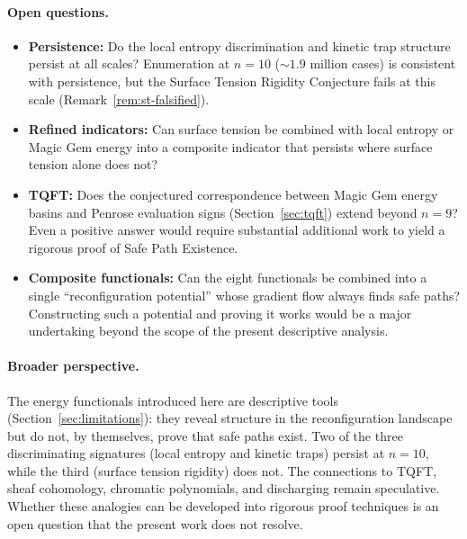 \paragraph{Open questions.}
\begin{itemize}
  \item \textbf{Persistence:} Do the local entropy discrimination and
    kinetic trap structure persist at all scales? Enumeration at
    $n = 10$ (${\sim}1.9$ million cases) is consistent with
    persistence, but the Surface Tension Rigidity Conjecture fails at
    this scale (Remark~\ref{rem:st-falsified}).
  \item \textbf{Refined indicators:} Can surface tension be combined
    with local entropy or Magic Gem energy into a composite indicator
    that persists where surface tension alone does not?
  \item \textbf{TQFT:} Does the conjectured correspondence between
    Magic Gem energy basins and Penrose evaluation signs
    (Section~\ref{sec:tqft}) extend beyond $n = 9$? Even a positive
    answer would require substantial additional work to yield a
    rigorous proof of Safe Path Existence.
  \item \textbf{Composite functionals:} Can the eight functionals be
    combined into a single ``reconfiguration potential'' whose gradient
    flow always finds safe paths? Constructing such a potential and
    proving it works would be a major undertaking beyond the scope of
    the present descriptive analysis.
\end{itemize}

\paragraph{Broader perspective.}
The energy functionals introduced here are descriptive tools
(Section~\ref{sec:limitations}): they reveal structure in the
reconfiguration landscape but do not, by themselves, prove that safe
paths exist. Two of the three discriminating signatures (local entropy
and kinetic traps) persist at $n = 10$, while the third (surface
tension rigidity) does not. The connections to TQFT, sheaf cohomology,
chromatic polynomials, and discharging remain speculative. Whether these
analogies can be developed into rigorous proof techniques is an open
question that the present work does not resolve.
